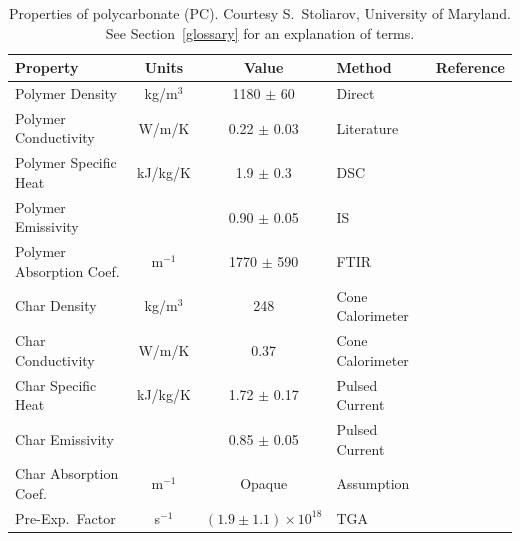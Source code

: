 \begin{table}[h!]
\caption[Properties of polycarbonate (PC).]{Properties of polycarbonate (PC). Courtesy S.~Stoliarov, University of Maryland. See Section~\ref{glossary} for an explanation of terms.}
\begin{center}
\begin{tabular}{|l|c|c|l|l|}
\hline
Property                    & Units         & Value                             & Method                &  Reference                                \\ \hline \hline
Polymer Density             & kg/m$^3$      & 1180 $\pm$ 60                     & Direct                &  \cite{Stoliarov:CF2010}                  \\ \hline
Polymer Conductivity        & W/m/K         & 0.22 $\pm$ 0.03                   & Literature            &  \cite{Stoliarov:CF2010}                  \\ \hline
Polymer Specific Heat       & kJ/kg/K       & 1.9 $\pm$ 0.3                     & DSC                   &  \cite{Stoliarov:PDS2008}                 \\ \hline
Polymer Emissivity          &               & 0.90 $\pm$ 0.05                   & IS                    &  \cite{Hallman:PES1974}                   \\ \hline
Polymer Absorption Coef.    & m$^{-1}$      & 1770 $\pm$ 590                    & FTIR                  &  \cite{Tsilingiris:ECM2003}               \\ \hline
Char Density                & kg/m$^3$      & 248                               & Cone Calorimeter      &  \cite{Stoliarov:CF2010}                  \\ \hline
Char Conductivity           & W/m/K         & 0.37                              & Cone Calorimeter      &  \cite{Stoliarov:CF2010}                  \\ \hline
Char Specific Heat          & kJ/kg/K       & 1.72 $\pm$ 0.17                   & Pulsed Current        &  \cite{Stoliarov:CF2010,Matsumoto:1996}   \\ \hline
Char Emissivity             &               & 0.85 $\pm$ 0.05                   & Pulsed Current        &  \cite{Stoliarov:CF2010,Matsumoto:1996}   \\ \hline
Char Absorption Coef.       & m$^{-1}$      & Opaque                            & Assumption            &  \cite{Stoliarov:CF2010}                  \\ \hline
Pre-Exp.~Factor             & s$^{-1}$      & $(1.9 \pm 1.1) \times 10^{18}$    & TGA                   &  \cite{Stoliarov:CF2010}                  \\ \hline

\end{tabular}
\end{center}
\end{table}
